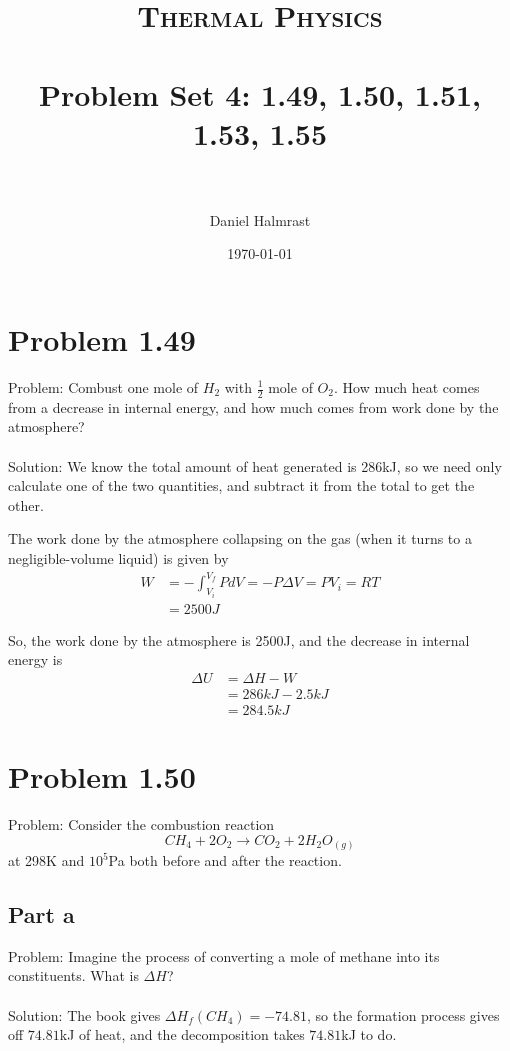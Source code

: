 \documentclass[paper=a4, fontsize=11pt]{scrartcl} %
\title{	
\normalfont \normalsize 
\textsc{Thermal Physics} \\ [25pt] %
\horrule{0.5pt} \\[0.4cm] %
\huge Problem Set 4: 1.49, 1.50, 1.51, 1.53, 1.55 \\ %
\horrule{2pt} \\[0.5cm] %
}
\author{Daniel Halmrast} %
\date{\normalsize\today} %
\numberwithin{equation}{section} %
\numberwithin{figure}{section} %
\numberwithin{table}{section} %
\begin{document}
\maketitle %


\section*{Problem 1.49}
Problem: Combust one mole of $H_2$ with $\frac{1}{2}$ mole of $O_2$. How much heat
comes from a decrease in internal energy, and how much comes from work done by the
atmosphere?
\\
\\
Solution:
We know the total amount of heat generated is 286kJ, so we need only calculate one of the
two quantities, and subtract it from the total to get the other.

The work done by the atmosphere collapsing on the gas (when it turns to a negligible-volume
liquid) is given by
\[
\begin{aligned}
W &= -\int_{V_i}^{V_f} PdV = -P\Delta V = PV_i = RT\\
  &= 2500J
\end{aligned}
\]

So, the work done by the atmosphere is 2500J, and the decrease in internal energy is
\[
\begin{aligned}
\Delta U &= \Delta H - W\\
         &= 286kJ - 2.5kJ\\
         &= 284.5kJ
\end{aligned}
\]

\section*{Problem 1.50}
Problem:
Consider the combustion reaction
\[
CH_4 + 2O_2 \to CO_2 + 2H_2O_{(g)}
\]
at 298K and $10^5$Pa both before and after the reaction.

\subsection*{Part a}
Problem: Imagine the process of converting a mole of methane into its constituents.
What is $\Delta H$?
\\
\\
Solution:
The book gives $\Delta H_f(CH_4) = -74.81$, so the formation process gives off $74.81$kJ of
heat, and the decomposition takes $74.81$kJ to do.
\end{document}
